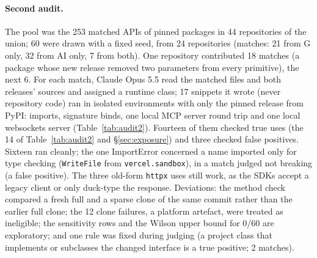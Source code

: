 \documentclass[11pt]{article}
\newcommand{\code}[1]{\texttt{#1}}
\begin{document}
\paragraph{Second audit.}
The pool was the 253 matched APIs of pinned packages in 44 repositories of the union; 60 were drawn with a fixed seed, from 24 repositories (matches: 21 from G only, 32 from AI only, 7 from both). One repository contributed 18 matches (a package whose new release removed two parameters from every primitive), the next 6.
For each match, Claude Opus 5.5 read the matched files and both releases' sources and assigned a runtime class; 17 snippets it wrote (never repository code) ran in isolated environments with only the pinned release from PyPI: imports, signature binds, one local MCP server round trip and one local websockets server (Table~\ref{tab:audit2}). Fourteen of them checked true uses (the 14 of Table~\ref{tab:audit2} and \S\ref{sec:exposure}) and three checked false positives. Sixteen ran cleanly; the one ImportError concerned a name imported only for type checking (\code{WriteFile} from \code{vercel.sandbox}), in a match judged not breaking (a false positive).
The three old-form \code{httpx} uses still work, as the SDKs accept a legacy client or only duck-type the response.
Deviations: the method check compared a fresh full and a sparse clone of the same commit rather than the earlier full clone; the 12 clone failures, a platform artefact, were treated as ineligible; the sensitivity rows and the Wilson upper bound for 0/60 are exploratory; and one rule was fixed during judging (a project class that implements or subclasses the changed interface is a true positive; 2 matches).
\end{document}

